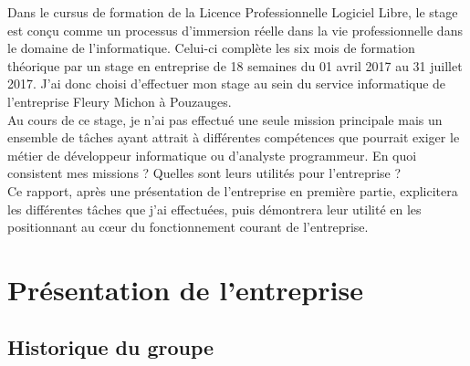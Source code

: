 \documentclass[a4paper,12pt]{extarticle}
\begin{document}
	Dans le cursus de formation de la Licence Professionnelle Logiciel Libre, le stage est conçu comme un processus d’immersion réelle dans la vie professionnelle dans le domaine de l’informatique. Celui-ci complète les six mois de formation théorique par un stage en entreprise de 18 semaines du 01 avril 2017 au 31 juillet 2017.
J’ai donc choisi d’effectuer mon stage au sein du service informatique de l’entreprise Fleury Michon à Pouzauges.\\
Au cours de ce stage, je n’ai pas effectué une seule mission principale mais un ensemble de tâches ayant attrait à différentes compétences que pourrait exiger le métier de développeur informatique ou d’analyste programmeur. En quoi consistent mes missions ? Quelles sont leurs utilités pour l’entreprise ?\\
Ce rapport, après une présentation de l’entreprise en première partie, explicitera les différentes tâches que j’ai effectuées, puis démontrera leur utilité en les positionnant au cœur du fonctionnement courant de l’entreprise.\\

	\clearpage
	
	\section{Présentation de l’entreprise}
	
	\subsection{Historique du groupe}
		\paragraph{}
\end{document}
